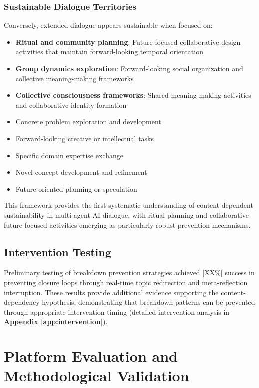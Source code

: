 \documentclass[11pt,letterpaper]{article}
\newcommand{\interventionSuccessRate}{[XX\%]} %
\begin{document}
\subsubsection{Sustainable Dialogue Territories}
Conversely, extended dialogue appears sustainable when focused on:
\begin{itemize}
    \item \textbf{Ritual and community planning}: Future-focused collaborative design activities that maintain forward-looking temporal orientation
    \item \textbf{Group dynamics exploration}: Forward-looking social organization and collective meaning-making frameworks
    \item \textbf{Collective consciousness frameworks}: Shared meaning-making activities and collaborative identity formation
    \item Concrete problem exploration and development
    \item Forward-looking creative or intellectual tasks
    \item Specific domain expertise exchange
    \item Novel concept development and refinement
    \item Future-oriented planning or speculation
\end{itemize}

This framework provides the first systematic understanding of content-dependent sustainability in multi-agent AI dialogue, with ritual planning and collaborative future-focused activities emerging as particularly robust prevention mechanisms.

\subsection{Intervention Testing}

Preliminary testing of breakdown prevention strategies achieved \interventionSuccessRate{} success in preventing closure loops through real-time topic redirection and meta-reflection interruption. These results provide additional evidence supporting the content-dependency hypothesis, demonstrating that breakdown patterns can be prevented through appropriate intervention timing (detailed intervention analysis in \textbf{Appendix \ref{app:intervention}}).

\section{Platform Evaluation and Methodological Validation}
\end{document}
